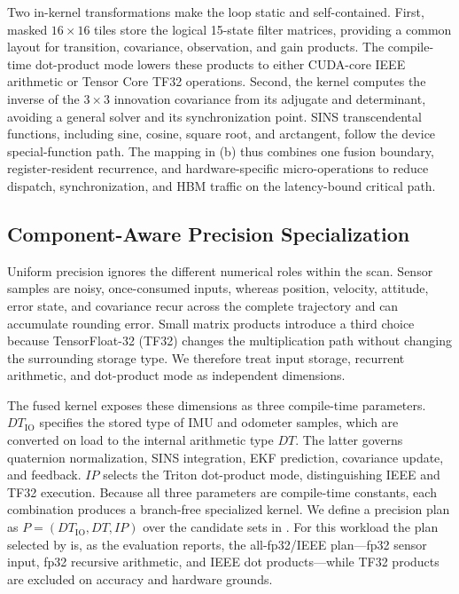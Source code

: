 Two in-kernel transformations make the loop static and self-contained. First, masked $16\times16$ tiles store the logical 15-state filter matrices, providing a common layout for transition, covariance, observation, and gain products. The compile-time dot-product mode lowers these products to either CUDA-core IEEE arithmetic or Tensor Core TF32 operations. Second, the kernel computes the inverse of the $3\times3$ innovation covariance from its adjugate and determinant, avoiding a general solver and its synchronization point. SINS transcendental functions, including sine, cosine, square root, and arctangent, follow the device special-function path. The mapping in (b) thus combines one fusion boundary, register-resident recurrence, and hardware-specific micro-operations to reduce dispatch, synchronization, and HBM traffic on the latency-bound critical path.

\subsection{Component-Aware Precision Specialization}
\label{subsec:mixed-precision}

Uniform precision ignores the different numerical roles within the scan. Sensor samples are noisy, once-consumed inputs, whereas position, velocity, attitude, error state, and covariance recur across the complete trajectory and can accumulate rounding error. Small matrix products introduce a third choice because TensorFloat-32 (TF32) changes the multiplication path without changing the surrounding storage type. We therefore treat input storage, recurrent arithmetic, and dot-product mode as independent dimensions.

The fused kernel exposes these dimensions as three compile-time parameters. $\mathit{DT}_{\mathrm{IO}}$ specifies the stored type of IMU and odometer samples, which are converted on load to the internal arithmetic type $\mathit{DT}$. The latter governs quaternion normalization, SINS integration, EKF prediction, covariance update, and feedback. $\mathit{IP}$ selects the Triton dot-product mode, distinguishing IEEE and TF32 execution. Because all three parameters are compile-time constants, each combination produces a branch-free specialized kernel. We define a precision plan as $P=(\mathit{DT}_{\mathrm{IO}},\mathit{DT},\mathit{IP})$ over the candidate sets in . For this workload the plan selected by  is, as the evaluation reports, the all-fp32/IEEE plan---fp32 sensor input, fp32 recursive arithmetic, and IEEE dot products---while TF32 products are excluded on accuracy and hardware grounds.

